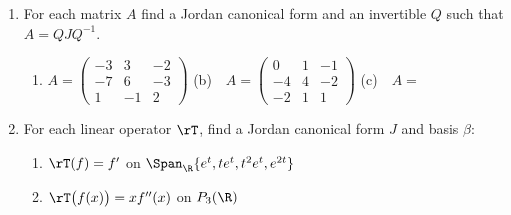 \begin{exercises}
\begin{enumerate}
\[%
		\]
	\begin{enumerate}
	  \item Find the characteristic polynomial of $\rT$.
	  \item Find the dot diagram for each eigenvalue.
	  \item For each eigenvalue find the smallest $k_j$ such that $K_{\lambda_j}=\cN(\rT-\lambda_j\I)^{k_j}$.
	\end{enumerate}
	  
	\item For each matrix $A$ find a Jordan canonical form and an invertible $Q$ such that $A=QJQ^{-1}$.
	\begin{enumerate}
	  \item $A=\begin{pmatrix}
	  -3 & 3 & -2\\
		-7 & 6 & -3\\
		1 & -1 & 2
	  \end{pmatrix}$\qquad
	  (b)\ \ $A=\begin{pmatrix}
	  0 & 1 & -1\\
		-4 & 4 & -2\\
		-2 & 1 & 1
	  \end{pmatrix}$\qquad
	  (c)\ \ $A=$
	\end{enumerate}
	
	\item For each linear operator $\rT$, find a Jordan canonical form $J$ and basis $\beta$:
	\begin{enumerate}
	  \item $\rT(f)=f'$ on $\Span_\R\{e^t,te^t,t^2e^{t},e^{2t}\}$
	  
	  \item $\rT\bigl(f(x)\bigr)=xf''(x)$ on $P_3(\R)$
	  

\end{enumerate}
\end{enumerate}
\end{exercises}
